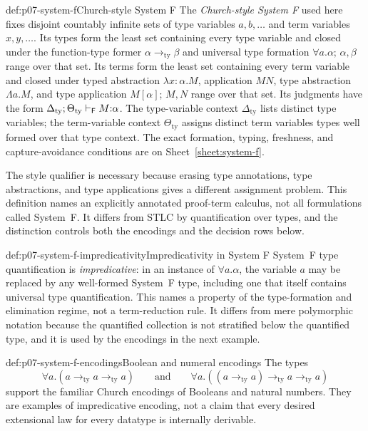 \begin{hbdefinition}{def:p07-system-f}{Church-style System F}
The \emph{Church-style System F} used here fixes disjoint countably infinite
sets of type variables \(a,b,\ldots\) and term variables
\(x,y,\ldots\).  Its types form the least set containing every type variable
and closed under the function-type former
\(\alpha\mathbin{\to_{\mathrm{ty}}}\beta\) and universal type formation
\(\forall a.\alpha\); \(\alpha,\beta\) range over that set.  Its terms form
the least set containing every term variable and closed under typed
abstraction \(\lambda x{:}\alpha.M\), application \(MN\), type abstraction
\(\Lambda a.M\), and type application \(M[\alpha]\); \(M,N\) range over that
set.  Its judgments have the form
\(\Delta_{\mathrm{ty}};\Theta_{\mathrm{ty}}\vdash_{\mathsf F}M{:}\alpha\).
The type-variable context \(\Delta_{\mathrm{ty}}\) lists distinct type
variables; the term-variable context \(\Theta_{\mathrm{ty}}\) assigns
distinct term variables types well formed over that type context.  The exact
formation, typing, freshness, and capture-avoidance conditions are on
Sheet~\ref{sheet:system-f}.

The style qualifier is necessary because erasing type annotations, type
abstractions, and type applications gives a different assignment problem.
This definition names an explicitly annotated proof-term calculus, not all
formulations called System~F.  It differs from STLC by quantification over
types, and the distinction controls both the encodings and the decision rows
below.
\end{hbdefinition}

\begin{hbdefinition}{def:p07-system-f-impredicativity}{Impredicativity in System F}
System~F type quantification is \emph{impredicative}: in an instance of
\(\forall a.\alpha\), the variable \(a\) may be replaced by any well-formed
System~F type, including one that itself contains universal type
quantification.  This names a property of the type-formation and elimination
regime, not a term-reduction rule.  It differs from mere polymorphic notation
because the quantified collection is not stratified below the quantified
type, and it is used by the encodings in the next example.
\end{hbdefinition}

\begin{hbexample}{def:p07-system-f-encodings}{Boolean and numeral encodings}
The types
\[
  \forall a.(a\mathbin{\to_{\mathrm{ty}}}a
    \mathbin{\to_{\mathrm{ty}}}a)
  \qquad\text{and}\qquad
  \forall a.((a\mathbin{\to_{\mathrm{ty}}}a)
    \mathbin{\to_{\mathrm{ty}}}a\mathbin{\to_{\mathrm{ty}}}a)
\]
support the familiar Church encodings of Booleans and natural numbers.  They
are examples of impredicative encoding, not a claim that every desired
extensional law for every datatype is internally derivable.
\end{hbexample}

